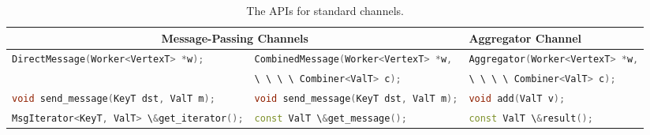\documentclass{sokendai_thesis} %
\newcommand{\PP}{Pregel+}
\newcommand{\inlineCPP}[1]{\lstinline[basicstyle=\small\ttfamily,language=c++]|#1|}
\begin{document}

\begin{table}[t]
\centering
\caption{The APIs for standard channels.}
\label{tab:basic-apis}
\begin{tabular}{l|l|l}
\hline
  \multicolumn{2}{c|}{\textbf{Message-Passing Channels}}
& \textbf{Aggregator Channel} \\
\hline
  \inlineCPP{DirectMessage(Worker<VertexT> *w);}
& \inlineCPP{CombinedMessage(Worker<VertexT> *w,}
& \inlineCPP{Aggregator(Worker<VertexT> *w,} \\

& \inlineCPP{\ \ \ \ Combiner<ValT> c);}
& \inlineCPP{\ \ \ \ Combiner<ValT> c);} \\
\hline
  \inlineCPP{void send_message(KeyT dst, ValT m);}
& \inlineCPP{void send_message(KeyT dst, ValT m);}
& \inlineCPP{void add(ValT v);} \\
  \inlineCPP{MsgIterator<KeyT, ValT> \&get_iterator();}
& \inlineCPP{const ValT \&get_message();}
& \inlineCPP{const ValT \&result();} \\
\hline
\end{tabular}
\end{table}
\end{document}
